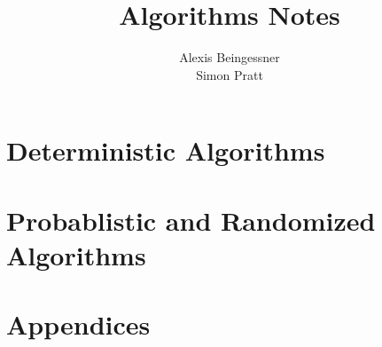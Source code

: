 \documentclass[11pt]{book}
\title{Algorithms Notes}
\date{}
\author{Alexis Beingessner\\Simon Pratt}
\theoremstyle{definition}
\begin{document}
\maketitle
\tableofcontents
\part{Deterministic Algorithms}
\begin{multicols}{2}
\end{multicols}
\part{Probablistic and Randomized Algorithms}
\begin{multicols}{2}
  
\end{multicols}
\part{Appendices}
\begin{multicols}{2}
  \appendix
\end{multicols}
\end{document}

